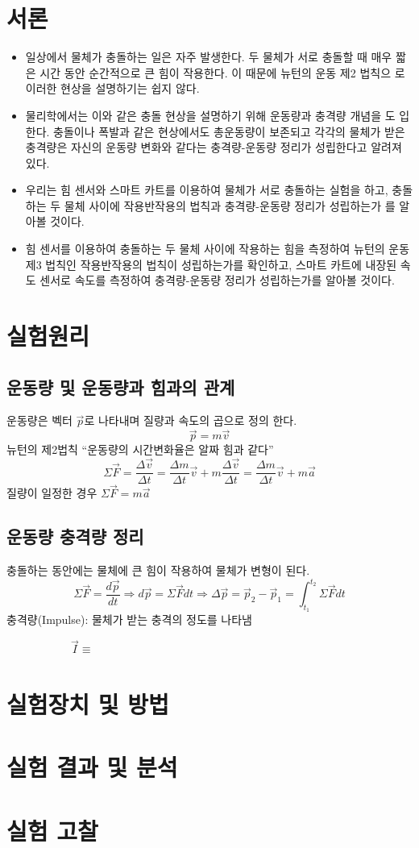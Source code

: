 \documentclass[12pt,a4paper]{article}
\begin{document}
\section{서론}
\begin{itemize}
    \item 일상에서 물체가 충돌하는 일은 자주 발생한다. 두 물체가 서로 충돌할 때 매우
        짧은 시간 동안 순간적으로 큰 힘이 작용한다. 이 때문에 뉴턴의 운동 제2 법칙으
        로 이러한 현상을 설명하기는 쉽지 않다.
    \item 물리학에서는 이와 같은 충돌 현상을 설명하기 위해 운동량과 충격량 개념을 도
        입한다. 충돌이나 폭발과 같은 현상에서도 총운동량이 보존되고 각각의 물체가
        받은 충격량은 자신의 운동량 변화와 같다는 충격량-운동량 정리가 성립한다고
        알려져 있다.
    \item 우리는 힘 센서와 스마트 카트를 이용하여 물체가 서로 충돌하는 실험을 하고,
        충돌하는 두 물체 사이에 작용반작용의 법칙과 충격량-운동량 정리가 성립하는가
        를 알아볼 것이다.
    \item 힘 센서를 이용하여 충돌하는 두 물체 사이에 작용하는 힘을 측정하여 뉴턴의
        운동 제3 법칙인 작용반작용의 법칙이 성립하는가를 확인하고, 스마트 카트에
        내장된 속도 센서로 속도를 측정하여 충격량-운동량 정리가 성립하는가를 알아볼
        것이다.
\end{itemize}
\section{실험원리}
\subsection{운동량 및 운동량과 힘과의 관계}
운동량은 벡터 $\vec{p}$로 나타내며 질량과 속도의 곱으로 정의 한다.
$$\vec{p}=m\vec{v}$$
뉴턴의 제2법칙 “운동량의 시간변화율은 알짜 힘과 같다”
$$\Sigma\vec{F}=\frac{\Delta\vec{v}}{\Delta t} =
    \frac{\Delta m}{\Delta t}\vec{v}+m\frac{\Delta\vec{v}}{\Delta t} = 
    \frac{\Delta m}{\Delta t}\vec{v}+m\vec{a}$$
질량이 일정한 경우 $\Sigma\vec{F}=m\vec{a}$
\subsection{운동량 충격량 정리}
충돌하는 동안에는 물체에 큰 힘이 작용하여 물체가 변형이 된다.
$$\Sigma\vec{F}=\frac{d\vec{p}}{dt} \Rightarrow
    d\vec{p} = \Sigma\vec{F}dt \Rightarrow
    \Delta\vec{p} = \vec{p}_2 - \vec{p}_1 = \int^{t_2}_{t_1}\Sigma\vec{F}dt$$
충격량(Impulse): 물체가 받는 충격의 정도를 나타냄
\begin{figure}[h!]
    \begin{subfigure}{0.3\textwidth}
        $\vec{I}\equiv $
    \end{subfigure}
\end{figure}
\section{실험장치 및 방법}
\section{실험 결과 및 분석}
\section{실험 고찰}
\end{document}
